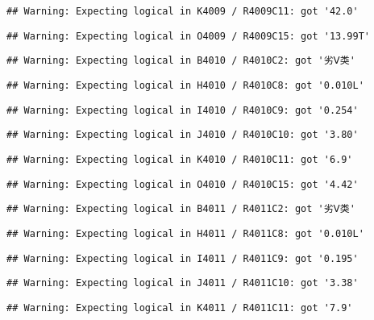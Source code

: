 \documentclass[
]{article}
\begin{document}
\begin{verbatim}
## Warning: Expecting logical in K4009 / R4009C11: got '42.0'
\end{verbatim}

\begin{verbatim}
## Warning: Expecting logical in O4009 / R4009C15: got '13.99T'
\end{verbatim}

\begin{verbatim}
## Warning: Expecting logical in B4010 / R4010C2: got '劣Ⅴ类'
\end{verbatim}

\begin{verbatim}
## Warning: Expecting logical in H4010 / R4010C8: got '0.010L'
\end{verbatim}

\begin{verbatim}
## Warning: Expecting logical in I4010 / R4010C9: got '0.254'
\end{verbatim}

\begin{verbatim}
## Warning: Expecting logical in J4010 / R4010C10: got '3.80'
\end{verbatim}

\begin{verbatim}
## Warning: Expecting logical in K4010 / R4010C11: got '6.9'
\end{verbatim}

\begin{verbatim}
## Warning: Expecting logical in O4010 / R4010C15: got '4.42'
\end{verbatim}

\begin{verbatim}
## Warning: Expecting logical in B4011 / R4011C2: got '劣Ⅴ类'
\end{verbatim}

\begin{verbatim}
## Warning: Expecting logical in H4011 / R4011C8: got '0.010L'
\end{verbatim}

\begin{verbatim}
## Warning: Expecting logical in I4011 / R4011C9: got '0.195'
\end{verbatim}

\begin{verbatim}
## Warning: Expecting logical in J4011 / R4011C10: got '3.38'
\end{verbatim}

\begin{verbatim}
## Warning: Expecting logical in K4011 / R4011C11: got '7.9'
\end{verbatim}
\end{document}
